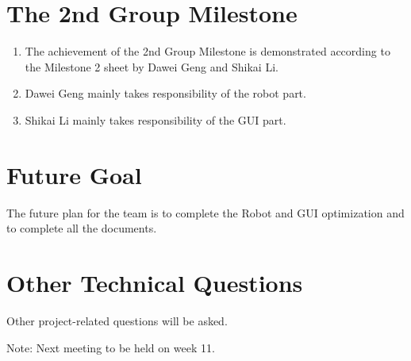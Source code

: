 \documentclass[11pt, a4paper]{article}
\begin{document}
\section{The 2nd Group Milestone}
\begin{enumerate}
\item The achievement of the 2nd Group Milestone is demonstrated according to the Milestone 2 sheet by Dawei Geng and Shikai Li.
\item Dawei Geng mainly takes responsibility of the robot part.
\item Shikai Li mainly takes responsibility of the GUI part.  
\end{enumerate}


\section{Future Goal}
The future plan for the team is to complete the Robot and GUI optimization and to complete all the documents.

\section{Other Technical Questions}
Other project-related questions will be asked.



\vspace*{10pt}
\noindent Note: Next meeting to be held on week 11.
\end{document}
